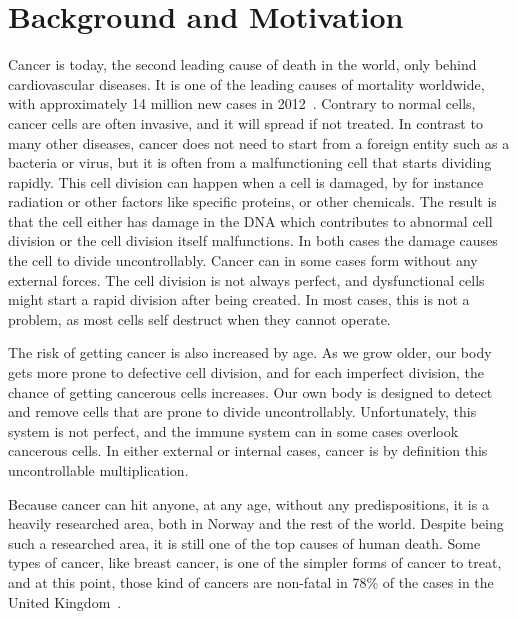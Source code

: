 \section{Background and Motivation}

Cancer is today, the second leading cause of death in the world, only behind cardiovascular diseases.  %
It is one of the leading causes of mortality worldwide, with approximately 14 million new cases in 2012~\cite{WHOCANCER}.
Contrary to normal cells, cancer cells are often invasive, and it will spread if not treated. 
In contrast to many other diseases, cancer does not need to start from a foreign entity such as a bacteria or virus, but it is often from a malfunctioning cell that starts dividing rapidly. 
This cell division can happen when a cell is damaged, by for instance radiation or other factors like specific proteins, or other chemicals. The result is that the cell either has damage in the DNA which contributes to abnormal cell division or the cell division itself malfunctions. In both cases the damage causes the cell to divide uncontrollably. 
Cancer can in some cases form without any external forces. The cell division is not always perfect, and dysfunctional cells might start a rapid division after being created. In most cases, this is not a problem, as most cells self destruct when they cannot operate. 

The risk of getting cancer is also increased by age. As we grow older, our body gets more prone to defective cell division, and for each imperfect division, the chance of getting cancerous cells increases.  
Our own body is designed to detect and remove cells that are prone to divide uncontrollably. Unfortunately, this system is not perfect, and the immune system can in some cases overlook cancerous cells.
In either external or internal cases, cancer is by definition this uncontrollable multiplication.




Because cancer can hit anyone, at any age, without any predispositions, it is a heavily researched area, both in Norway and the rest of the world. Despite being such a researched area, it is still one of the top causes of human death. 
Some types of cancer, like breast cancer, is one of the simpler forms of cancer to treat, and at this point, those kind of cancers are non-fatal in 78\% of the cases in the United Kingdom~\cite{UKCancer}. 
    
